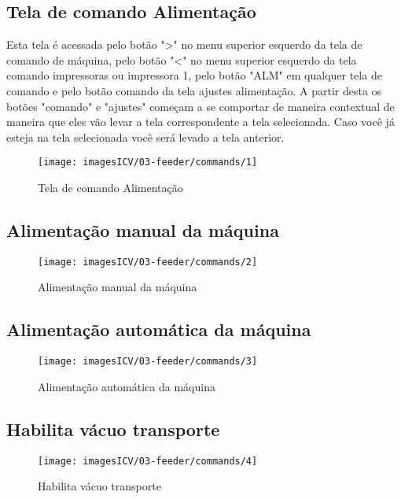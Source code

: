 \usepackage{graphicx}
\newpage
\thispagestyle{fancy}
\vspace{\fill}
\subsection{Tela de comando Alimentação}
Esta tela é acessada pelo botão "\textgreater" no menu superior esquerdo da tela de comando de máquina, pelo botão "\textless{}" no menu superior esquerdo da tela comando impressoras ou impressora 1, pelo botão "ALM" em qualquer tela de comando e pelo botão comando da tela ajustes alimentação. A partir desta os botões "comando" e "ajustes" começam a se comportar de maneira contextual de maneira que eles vão levar a tela correspondente a tela selecionada. Caso você já esteja na tela selecionada você será levado a tela anterior.
\vspace*{10pt}

\begin{figure}
    \centering
    \texttt{[image: imagesICV/03-feeder/commands/1]}
    \caption{Tela de comando Alimentação}
    \label{fig:}
\end{figure}
\newpage
\thispagestyle{fancy}
\vspace{\fill}

\subsection{Alimentação manual da máquina}

\begin{figure}
    \centering
    \texttt{[image: imagesICV/03-feeder/commands/2]}
    \caption{Alimentação manual da máquina}
    \label{fig:}
\end{figure}
\newpage
\thispagestyle{fancy}
\vspace{\fill}

\subsection{Alimentação automática da máquina}
\begin{figure}
    \centering
    \texttt{[image: imagesICV/03-feeder/commands/3]}
    \caption{Alimentação automática da máquina}
    \label{fig:}
\end{figure}
\newpage
\thispagestyle{fancy}
\vspace{\fill}

\subsection{Habilita vácuo transporte}
\begin{figure}
    \centering
    \texttt{[image: imagesICV/03-feeder/commands/4]}
    \caption{Habilita vácuo transporte}
    \label{fig:}
\end{figure}
\newpage
\thispagestyle{fancy}
\vspace{\fill}

